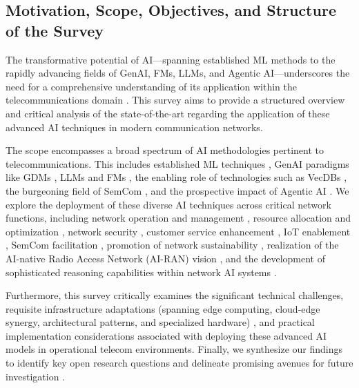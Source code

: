 \documentclass[sigconf]{acmart}
\begin{document}
\subsection{Motivation, Scope, Objectives, and Structure of the Survey}
\label{sec:intro_motivation}

The transformative potential of AI—spanning established ML methods to the rapidly advancing fields of GenAI, FMs, LLMs, and Agentic AI—underscores the need for a comprehensive understanding of its application within the telecommunications domain \cite{ref31, ref32, ref34, ref35}. This survey aims to provide a structured overview and critical analysis of the state-of-the-art regarding the application of these advanced AI techniques in modern communication networks.

The scope encompasses a broad spectrum of AI methodologies pertinent to telecommunications. This includes established ML techniques \cite{ref1, ref12}, GenAI paradigms like GDMs \cite{ref19, ref20, ref33}, LLMs and FMs \cite{ref2, ref8, ref16, ref17, ref18, ref26}, the enabling role of technologies such as VecDBs \cite{ref8, ref14}, the burgeoning field of SemCom \cite{ref22, ref23}, and the prospective impact of Agentic AI \cite{ref35}. We explore the deployment of these diverse AI techniques across critical network functions, including network operation and management \cite{ref6, ref9, ref25, ref28}, resource allocation and optimization \cite{ref9, ref11, ref12, ref19, ref21}, network security \cite{ref5, ref12, ref20, ref26, ref30}, customer service enhancement \cite{ref2}, IoT enablement \cite{ref15, ref26, ref29}, SemCom facilitation \cite{ref22, ref23, ref26}, promotion of network sustainability \cite{ref29}, realization of the AI-native Radio Access Network (AI-RAN) vision \cite{ref34}, and the development of sophisticated reasoning capabilities within network AI systems \cite{ref6, ref17, ref21, ref35}.

Furthermore, this survey critically examines the significant technical challenges, requisite infrastructure adaptations (spanning edge computing, cloud-edge synergy, architectural patterns, and specialized hardware) \cite{ref2, ref3, ref4, ref6, ref8, ref9, ref12, ref14, ref16, ref17, ref18, ref20, ref21, ref22, ref23, ref25, ref26, ref29, ref31, ref34, ref35}, and practical implementation considerations associated with deploying these advanced AI models in operational telecom environments. Finally, we synthesize our findings to identify key open research questions and delineate promising avenues for future investigation \cite{ref1, ref3, ref4, ref5, ref6, ref8, ref10, ref12, ref13, ref15, ref16, ref17, ref18, ref19, ref20, ref21, ref23, ref25, ref26, ref29, ref30, ref31, ref34, ref35}.
\end{document}
